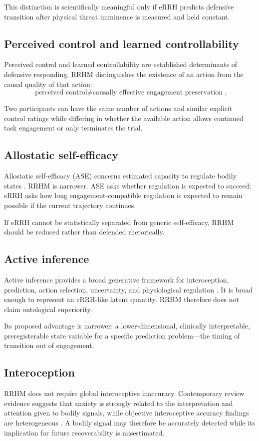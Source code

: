 \documentclass[9pt,twocolumn]{article}
\begin{document}
This distinction is scientifically meaningful only if eRRH predicts defensive transition after physical threat imminence is measured and held constant.

\subsection{Perceived control and learned controllability}
Perceived control and learned controllability are established determinants of defensive responding. RRHM distinguishes the existence of an action from the causal quality of that action:
\[
\boxed{\text{perceived control}\neq\text{causally effective engagement preservation}}.
\]

Two participants can have the same number of actions and similar explicit control ratings while differing in whether the available action allows continued task engagement or only terminates the trial.

\subsection{Allostatic self-efficacy}
Allostatic self-efficacy (ASE) concerns estimated capacity to regulate bodily states \cite{stephan2016,hess2024}. RRHM is narrower. ASE asks whether regulation is expected to succeed; eRRH asks how long engagement-compatible regulation is expected to remain possible if the current trajectory continues.

If eRRH cannot be statistically separated from generic self-efficacy, RRHM should be reduced rather than defended rhetorically.

\subsection{Active inference}
Active inference provides a broad generative framework for interoception, prediction, action selection, uncertainty, and physiological regulation \cite{paulus2019}. It is broad enough to represent an eRRH-like latent quantity. RRHM therefore does not claim ontological superiority.

Its proposed advantage is narrower: a lower-dimensional, clinically interpretable, preregisterable state variable for a specific prediction problem---the timing of transition out of engagement.

\subsection{Interoception}
RRHM does not require global interoceptive inaccuracy. Contemporary review evidence suggests that anxiety is strongly related to the interpretation and attention given to bodily signals, while objective interoceptive accuracy findings are heterogeneous \cite{jenkinson2024,clemente2024}. A bodily signal may therefore be accurately detected while its implication for future recoverability is misestimated.
\end{document}
